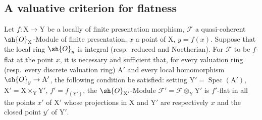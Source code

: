 \subsection{A valuative criterion for flatness}
\label{subsection:IV.11.8}

\begin{theorem}[11.8.1]
\label{IV.11.8.1}
Let $f:\mathrm{X}\to\mathrm{Y}$ be a locally of finite presentation morphism, $\mathscr{F}$ a quasi-coherent $\sh{O}_\mathrm{X}$-Module of finite presentation, $x$ a point of $\mathrm{X}$, $y=f(x)$.
Suppose that the local ring $\sh{O}_y$ is integral (resp.\ reduced and Noetherian).
For $\mathscr{F}$ to be $f$-flat at the point $x$, it is necessary and sufficient that, for every valuation ring (resp.\ every discrete valuation ring) $\mathrm{A}'$ and every local homomorphism $\sh{O}_y\to\mathrm{A}'$, the following condition be satisfied: setting $\mathrm{Y}'=\operatorname{Spec}(\mathrm{A}')$, $\mathrm{X}'=\mathrm{X}\times_\mathrm{Y}\mathrm{Y}'$, $f'=f_{(\mathrm{Y}')}$, the $\sh{O}_{\mathrm{X}'}$-Module $\mathscr{F}'=\mathscr{F}\otimes_\mathrm{Y}\mathrm{Y}'$ is $f'$-flat in all the points $x'$ of $\mathrm{X}'$ whose projections in $\mathrm{X}$ and $\mathrm{Y}'$ are respectively $x$ and the closed point $y'$ of $\mathrm{Y}'$.
\end{theorem}

